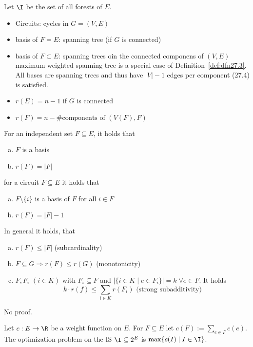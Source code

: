 \begin{xmp+}
Let $\I$ be the set of all forests of $E$.
\begin{itemize}
\item Circuits: cycles in $G = (V, E)$
\item basis of $F = E$: spanning tree (if $G$ is connected)
\item basis of $F \subset E$: spanning trees oin the connected componens of
$(V,E)$ \rightarrow maximum weighted spanning tree is a special case of
Definition~\ref{def:dfn27.3}. All bases are spanning trees and thus have
$|V|-1$ edges per component \Rightarrow (27.4) is satisfied.
\item $r(E) = n-1$ if $G$ is connected
\item $r(F) = n- \text{#components of } (V(F), F)$
\end{itemize}
\end{xmp+}

\begin{lem}\label{lem:lem27.2}
For an independent set $F \subseteq E$, it holds that
\begin{enumerate}[(a)]
\item $F$ is a basis
\item $r(F) = |F|$
\end{enumerate}
for a circuit $F \subseteq E$ it holds that
\begin{enumerate}[(a)]
\item $F \setminus \{i\}$ is a basis of $F$ for all $i \in F$
\item $r(F) = |F| - 1$
\end{enumerate}
In general it holds, that 
\begin{enumerate}[(a)]
\item $r(F) \leq |F|$ (subcardinality)
\item $F \subseteq G \Rightarrow r(F) \leq r(G)$ (monotonicity)
\item $F, F_i$ $(i \in K)$ with $F_i \subseteq F$ and $| \{ i \in K \mid e
\in F_i \}| = k \;\forall e \in F$.
It holds
\[
	k \cdot r(f) \leq \sum_{i \in K} r(F_i) \text{ (strong subadditivity)}
\]
\end{enumerate}
No proof.
\end{lem}

\begin{defn}\label{def:defn27.3}
Let $c : E \rightarrow \R$ be a weight function on $E$. For $F \subseteq E$
let $c(F) := \sum_{e \in F} c(e)$. The optimization problem on the IS $\I
\subseteq 2^E$ is $\max \{ c(I) \mid I \in \I \}$.
\end{defn}

